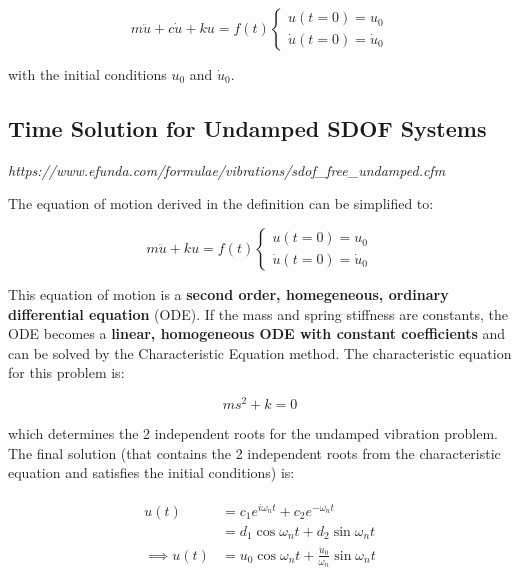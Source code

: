 \documentclass[10pt,b5paper,titlepage]{book}
\newenvironment{ematrix}
{
    \begin{eqnarray}
        \begin{aligned}
}
{
        \end{aligned}
    \end{eqnarray}
}
\begin{document}
\begin{equation}
    m \ddot{u} + c \dot{u} + k u = f(t)
        \left\{ \begin{matrix}
                u(t=0) = u_0\\
                \dot{u}(t=0) = \dot{u}_0
          \end{matrix} \right.
\end{equation}

with the initial conditions $ u_0 $ and $ \dot{u}_0 $.


\subsection{Time Solution for Undamped SDOF Systems}

\textit{https://www.efunda.com/formulae/vibrations/sdof\_free\_undamped.cfm}

The equation of motion derived in the definition can be simplified to:

\begin{equation}
    m \ddot{u} + k u = f(t)
        \left\{ \begin{matrix}
                u(t=0) = u_0\\
                \dot{u}(t=0) = \dot{u}_0
          \end{matrix} \right.
\end{equation}

This equation of motion is a
\textbf{second order, homegeneous, ordinary differential equation} (ODE). If the mass
and spring stiffness are constants, the ODE becomes a
\textbf{linear, homogeneous ODE with constant coefficients} and can be solved
by the Characteristic Equation method. The characteristic equation for this
problem is:

\begin{equation}
    m s^2 + k = 0
\end{equation}

which determines the 2 independent roots for the undamped vibration problem.
The final solution (that contains the 2 independent roots from the characteristic
equation and satisfies the initial conditions) is:

\begin{ematrix}
    u(t) &= c_1 e^{i \omega_n t} + c_2 e^{- \omega_n t}\\
         &= d_1 \cos{\omega_n t} + d_2 \sin{\omega_n t} \\
    \implies u(t) &= u_0 \cos{\omega_n t} + \frac{\dot{u}_0}{\omega_n} \sin{\omega_n t}
\end{ematrix}
\end{document}
